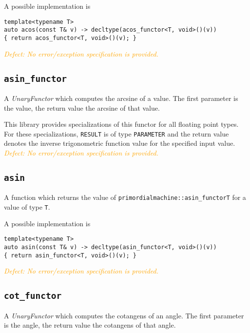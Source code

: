 \documentclass[oneside]{article}
\begin{document}
\noindent{}A possible implementation is
\begin{verbatim}
template<typename T>
auto acos(const T& v) -> decltype(acos_functor<T, void>()(v))
{ return acos_functor<T, void>()(v); }
\end{verbatim}

\noindent{}\textcolor{orange}{\textit{Defect: No error/exception specification is provided.}}
\subsection{\texttt{asin\_functor}}
A \textit{UnaryFunctor} which computes the
arcsine
of a value.
The first parameter is the value, the return value the arcsine of that value.

\noindent{}This library provides specializations of this functor for all floating point types.
For these specializations, \texttt{RESULT} is of type \texttt{PARAMETER} and the return value
denotes the inverse trigonometric function value for the specified input value.\\

\noindent{}\textcolor{orange}{\textit{Defect: No error/exception specification is provided.}}

\subsection{\texttt{asin}}
A function which returns the value of \texttt{primordialmachine::asin\_functor\textlangle T\textrangle}
for a value of type \texttt{T}.

\noindent{}A possible implementation is
\begin{verbatim}
template<typename T>
auto asin(const T& v) -> decltype(asin_functor<T, void>()(v))
{ return asin_functor<T, void>()(v); }
\end{verbatim}

\noindent{}\textcolor{orange}{\textit{Defect: No error/exception specification is provided.}}
\subsection{\texttt{cot\_functor}}
A \textit{UnaryFunctor} which computes the
cotangens of an angle.
The first parameter is the angle, the return value the cotangens of that angle.
\end{document}
